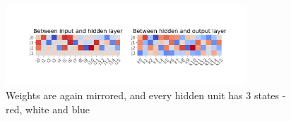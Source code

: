 \documentclass[12pt]{article}
\begin{document}
\begin{figure}
    \centering
    \includegraphics[height=3cm]{mlp16_w}
    \caption{Weights are again mirrored, and every hidden unit has 3 states - red, white and blue}
    \label{fig:mlp16_w}
\end{figure}
\end{document}
